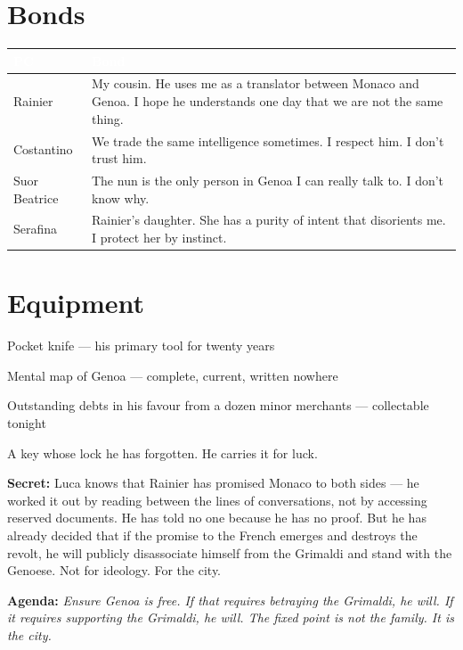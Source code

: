 \section*{Bonds}
\begin{table}[h]\centering\renewcommand{\arraystretch}{1.4}
\begin{tabularx}{\linewidth}{@{}L{2.6cm} X@{}}
\toprule{}
\textcolor{white}{\textbf{PC}} & \textcolor{white}{\textbf{Bond}} \\
\midrule
Rainier & My cousin. He uses me as a translator between Monaco and Genoa. I hope he understands one day that we are not the same thing. \\
Costantino & We trade the same intelligence sometimes. I respect him. I don't trust him. \\
Suor Beatrice & The nun is the only person in Genoa I can really talk to. I don't know why. \\
Serafina & Rainier's daughter. She has a purity of intent that disorients me. I protect her by instinct. \\
\bottomrule
\end{tabularx}
\end{table}

\section*{Equipment}
\begin{goldlist}
\item Pocket knife --- his primary tool for twenty years
\item Mental map of Genoa --- complete, current, written nowhere
\item Outstanding debts in his favour from a dozen minor merchants --- collectable tonight
\item A key whose lock he has forgotten. He carries it for luck.
\end{goldlist}

\clearpage
\begin{secretbox}
\textbf{Secret:} Luca knows that Rainier has promised Monaco to both sides --- he
worked it out by reading between the lines of conversations, not by accessing
reserved documents. He has told no one because he has no proof. But he has already
decided that if the promise to the French emerges and destroys the revolt, he will
publicly disassociate himself from the Grimaldi and stand with the Genoese.
Not for ideology. For the city.

\medskip\noindent\textcolor{SecretRed}{\textbf{Agenda:}}
\textit{Ensure Genoa is free. If that requires betraying the Grimaldi, he will.
If it requires supporting the Grimaldi, he will. The fixed point is not the family.
It is the city.}
\end{secretbox}

